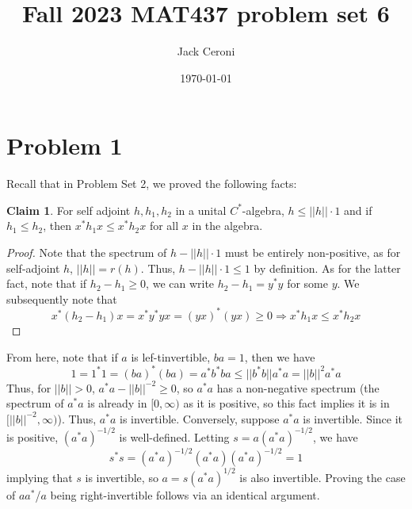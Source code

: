 \documentclass[aps,pra,showpacs,notitlepage,onecolumn,superscriptaddress,nofootinbib]{revtex4-1}
\newcommand{\hhrulefill}{\hspace{-1.0em}\hrulefill}
\theoremstyle{definition}
\newtheorem{claim}{Claim}[section]
\begin{document}
\title{Fall 2023 MAT437 problem set 6}
\author{Jack Ceroni}

\date{\today}

\maketitle

\hhrulefill

\section{Problem 1}

\noindent Recall that in Problem Set 2, we proved the following facts:

\begin{claim}
  For self adjoint $h, h_1, h_2$ in a unital $C^{*}$-algebra, $h \leq ||h|| \cdot 1$ and if $h_1 \leq h_2$, then $x^{*} h_1 x \leq x^{*} h_2 x$ for all $x$ in the algebra.
\end{claim}
\begin{proof}
  Note that the spectrum of $h - ||h|| \cdot 1$ must be entirely non-positive, as for self-adjoint $h$, $||h|| = r(h)$. Thus, $h - ||h|| \cdot 1 \leq 1$ by definition.
  As for the latter fact, note that if $h_2 - h_1 \geq 0$, we can write $h_2 - h_1 = y^{*} y$ for some $y$. We subsequently note that
  $$x^{*} (h_2 - h_1) x = x^{*} y^{*} y x = (yx)^{*} (yx) \geq 0 \Longrightarrow x^{*} h_1 x \leq x^{*} h_2 x$$
  \end{proof}

\noindent From here, note that if $a$ is lef-tinvertible, $ba = 1$, then we have
\begin{equation}
  1 = 1^{*} 1 = (ba)^{*} (ba) = a^{*} b^{*} b a \leq ||b^{*} b|| a^{*} a = ||b||^2 a^{*} a
\end{equation}
Thus, for $||b|| > 0$, $a^{*} a - ||b||^{-2} \geq 0$, so $a^{*} a$ has a non-negative spectrum (the spectrum of $a^{*} a$ is already in $[0, \infty)$ as it is positive, so this fact implies it is in $[||b||^{-2}, \infty)$).
    Thus, $a^{*} a$ is invertible. Conversely, suppose $a^{*} a$ is invertible. Since it is positive, $(a^{*} a)^{-1/2}$ is well-defined. Letting $s = a (a^{*} a)^{-1/2}$, we have
    $$s^{*} s = (a^{*} a)^{-1/2} (a^{*} a) (a^{*} a)^{-1/2} = 1$$
    implying that $s$ is invertible, so $a = s (a^{*} a)^{1/2}$ is also invertible. Proving the case of $a a^{*}$/$a$ being right-invertible follows via an identical argument.

    \hhrulefill
\end{document}
